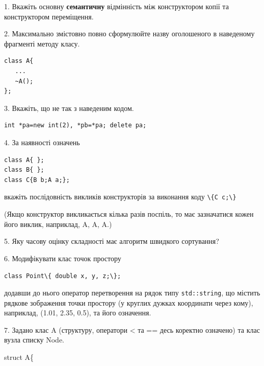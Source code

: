 \documentclass[12pt, ukrainian]{article}
\def\code#1{\Verb!#1!}
\begin{document}
{%
1. Вкажіть основну \textbf{семантичну} відмінність між конструктором копії та конструктором переміщення.%
\par
\vspace{2mm}
2. Максимально змістовно повно сформулюйте назву оголошеного в наведеному фрагменті методу класу.
\vspace{-3mm}
\begin{verbatim}class A{
   ...
   ~A();
};\end{verbatim}
\vspace{-3mm}
\par
\vspace{2mm}
3. Вкажіть, що не так з наведеним кодом.
\vspace{-3mm}
\begin{verbatim}int *pa=new int(2), *pb=*pa; delete pa;\end{verbatim}
\vspace{-3mm}
\par
\vspace{2mm}
4. За наявності означень
\vspace{-3mm}
\begin{verbatim}
class A{ };
class B{ };
class C{B b;A a;};\end{verbatim}
\vspace{-3mm}
вкажіть послідовність викликів конструкторів за виконання коду \code{\{C c;\}} 

(Якщо конструктор викликається кілька разів поспіль, то має зазначатися кожен його виклик, наприклад, A, A, A.)

\vspace{2mm}
5. Яку часову оцінку складності має алгоритм швидкого сортування?
\par
\vspace{2mm}
6. Модифікувати клас точок простору 

\qquad\code{class Point\{ double x, y, z;\};}


додавши до нього оператор перетворення на рядок типу \code{std::string}, що містить рядкове зображення точки простору (у круглих дужках координати через кому), наприклад, (1.01, 2.35, 0.5), та його означення.%
\par
\vspace{2mm}
7. 
Задано клас A (структуру, оператори < та == десь коректно означено) та клас вузла списку Node.

struct A\{

}
\end{document}
